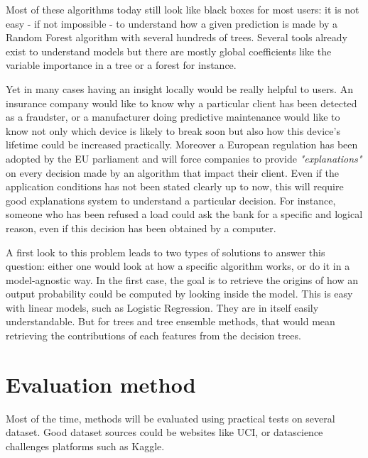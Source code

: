 \documentclass[a4paper]{article}
\begin{document}
Most of these algorithms today still look like black boxes for most users: it is not easy - if not impossible - to understand how a given prediction is made by a Random Forest algorithm with several hundreds of trees. Several tools already exist to understand models but there are mostly global coefficients like the variable importance in a tree or a forest for instance.

Yet in many cases having an insight locally would be really helpful to users. An insurance company would like to know why a particular client has been detected as a fraudster, or a manufacturer doing predictive maintenance would like to know not only which device is likely to break soon but also how this device's lifetime could be increased practically. Moreover a European regulation has been adopted by the EU parliament and will force companies to provide \textit{"explanations"} on every decision made by an algorithm that impact their client. Even if the application conditions has not been stated clearly up to now, this will require good explanations system to understand a particular decision. For instance, someone who has been refused a load could ask the bank for a specific and logical reason, even if this decision has been obtained by a computer.

A first look to this problem leads to two types of solutions to answer this question: either one would look at how a specific algorithm works, or do it in a model-agnostic way. In the first case, the goal is to retrieve the origins of how an output probability could be computed by looking inside the model. This is easy with linear models, such as Logistic Regression. They are in itself easily understandable. But for trees and tree ensemble methods, that would mean retrieving the contributions of each features from the decision trees.

\section{Evaluation method}

Most of the time, methods will be evaluated using practical tests on several dataset. Good dataset sources could be websites like UCI, or datascience challenges platforms such as Kaggle.
\end{document}
